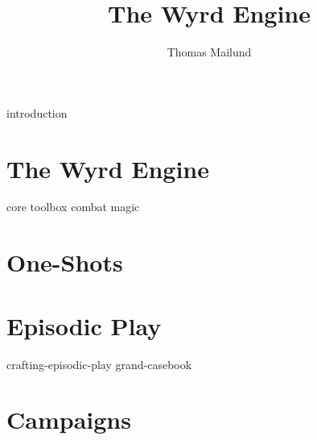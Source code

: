 \documentclass[twocolumn,nodeprecatedcode,bg=print]{dndbook/dndbook}
\title{The Wyrd Engine}
\author{Thomas Mailund}
\begin{document}
\DndSetThemeColor[DmgSlateGray]

\frontmatter
\maketitle
\tableofcontents

\mainmatter%


{introduction}

\part{The Wyrd Engine}
{core}
{toolbox}
{combat}
{magic}

\part{One-Shots}
% 

\part{Episodic Play}
{crafting-episodic-play}
{grand-casebook}

\part{Campaigns}


\printindex
\end{document}
